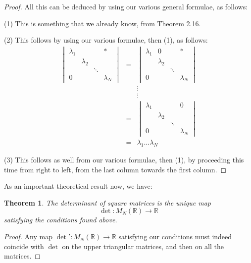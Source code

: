 \documentclass[12pt]{amsbook}
\newtheorem{theorem}{Theorem}[chapter]
\begin{document}
\begin{proof}
All this can be deduced by using our various general formulae, as follows:

\medskip

(1) This is something that we already know, from Theorem 2.16.

\medskip

(2) This follows by using our various formulae, then (1), as follows:
\begin{eqnarray*}
\begin{vmatrix}
\lambda_1&&&*\\ 
&\lambda_2\\
&&\ddots\\
0&&&\lambda_N\end{vmatrix}
&=&\begin{vmatrix}
\lambda_1&0&&*\\ 
&\lambda_2\\
&&\ddots\\
0&&&\lambda_N\end{vmatrix}\\
&&\vdots\\
&&\vdots\\
&=&\begin{vmatrix}
\lambda_1&&&0\\ 
&\lambda_2\\
&&\ddots\\
0&&&\lambda_N\end{vmatrix}\\
&=&\lambda_1\ldots\lambda_N
\end{eqnarray*}

(3) This follows as well from our various formulae, then (1), by proceeding this time from right to left, from the last column towards the first column.
\end{proof}

As an important theoretical result now, we have:


\begin{theorem}
The determinant of square matrices is the unique map
$$\det:M_N(\mathbb R)\to\mathbb R$$
satisfying the conditions found above.
\end{theorem}

\begin{proof}
Any map $\det':M_N(\mathbb R)\to\mathbb R$ satisfying our conditions must indeed coincide with $\det$ on the upper triangular matrices, and then on all the matrices.
\end{proof}
\end{document}
